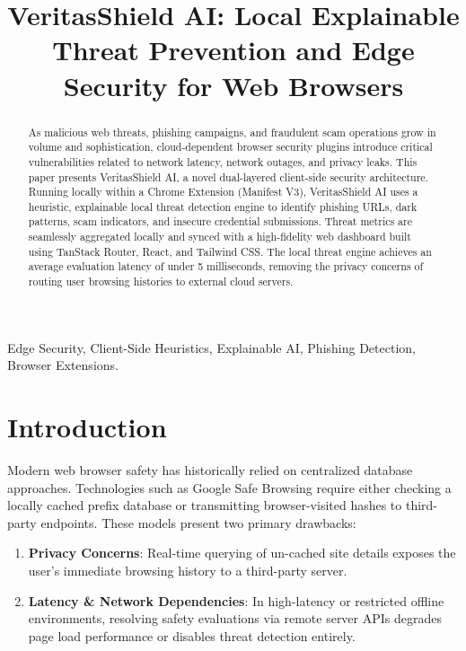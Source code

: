 \documentclass[conference]{IEEEtran}
\begin{document}
\title{VeritasShield AI: Local Explainable Threat Prevention and Edge Security for Web Browsers}

\author{
}

\maketitle

\begin{abstract}
As malicious web threats, phishing campaigns, and fraudulent scam operations grow in volume and sophistication, cloud-dependent browser security plugins introduce critical vulnerabilities related to network latency, network outages, and privacy leaks. This paper presents VeritasShield AI, a novel dual-layered client-side security architecture. Running locally within a Chrome Extension (Manifest V3), VeritasShield AI uses a heuristic, explainable local threat detection engine to identify phishing URLs, dark patterns, scam indicators, and insecure credential submissions. Threat metrics are seamlessly aggregated locally and synced with a high-fidelity web dashboard built using TanStack Router, React, and Tailwind CSS. The local threat engine achieves an average evaluation latency of under 5 milliseconds, removing the privacy concerns of routing user browsing histories to external cloud servers.
\end{abstract}

\begin{IEEEkeywords}
Edge Security, Client-Side Heuristics, Explainable AI, Phishing Detection, Browser Extensions.
\end{IEEEkeywords}

\section{Introduction}
Modern web browser safety has historically relied on centralized database approaches. Technologies such as Google Safe Browsing require either checking a locally cached prefix database or transmitting browser-visited hashes to third-party endpoints. These models present two primary drawbacks:
\begin{enumerate}
    \item \textbf{Privacy Concerns}: Real-time querying of un-cached site details exposes the user's immediate browsing history to a third-party server.
    \item \textbf{Latency & Network Dependencies}: In high-latency or restricted offline environments, resolving safety evaluations via remote server APIs degrades page load performance or disables threat detection entirely.
\end{enumerate}
\end{document}
